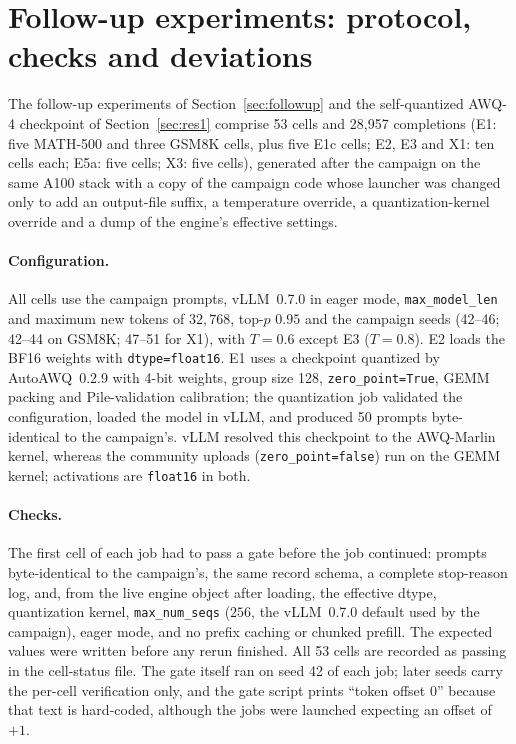 \documentclass[11pt,a4paper]{article}
\begin{document}
\FloatBarrier
\section{Follow-up experiments: protocol, checks and deviations}
\label{app:followup}
The follow-up experiments of Section~\ref{sec:followup} and the self-quantized AWQ-4 checkpoint of Section~\ref{sec:res1} comprise 53 cells and 28{,}957 completions (E1: five MATH-500 and three GSM8K cells, plus five E1c cells; E2, E3 and X1: ten cells each; E5a: five cells; X3: five cells), generated after the campaign on the same A100 stack with a copy of the campaign code whose launcher was changed only to add an output-file suffix, a temperature override, a quantization-kernel override and a dump of the engine's effective settings.

\paragraph{Configuration.} All cells use the campaign prompts, vLLM~0.7.0 in eager mode, \texttt{max\_model\_len} and maximum new tokens of $32{,}768$, top-$p$ $0.95$ and the campaign seeds (42--46; 42--44 on GSM8K; 47--51 for X1), with $T=0.6$ except E3 ($T=0.8$). E2 loads the BF16 weights with \texttt{dtype=float16}. E1 uses a checkpoint quantized by AutoAWQ~0.2.9 with 4-bit weights, group size 128, \texttt{zero\_point=True}, GEMM packing and Pile-validation calibration; the quantization job validated the configuration, loaded the model in vLLM, and produced 50 prompts byte-identical to the campaign's. vLLM resolved this checkpoint to the AWQ-Marlin kernel, whereas the community uploads (\texttt{zero\_point=false}) run on the GEMM kernel; activations are \texttt{float16} in both.

\paragraph{Checks.} The first cell of each job had to pass a gate before the job continued: prompts byte-identical to the campaign's, the same record schema, a complete stop-reason log, and, from the live engine object after loading, the effective dtype, quantization kernel, \texttt{max\_num\_seqs} ($256$, the vLLM~0.7.0 default used by the campaign), eager mode, and no prefix caching or chunked prefill. The expected values were written before any rerun finished. All 53 cells are recorded as passing in the cell-status file. The gate itself ran on seed 42 of each job; later seeds carry the per-cell verification only, and the gate script prints ``token offset 0'' because that text is hard-coded, although the jobs were launched expecting an offset of $+1$.
\end{document}
